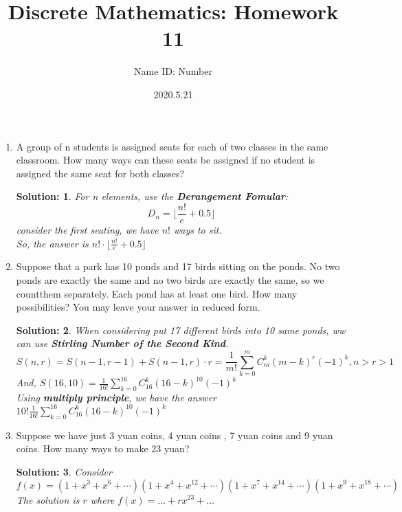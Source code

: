 \documentclass{article}
\title{Discrete Mathematics:  Homework 11}
\author{Name  \quad  \quad ID: Number}
\date{2020.5.21}
\theoremstyle{break}
\newtheorem*{solution*}{\textbf{Solution:} }
\begin{document}
\maketitle
\begin{enumerate}
        \item A group of n students is assigned seats for each of two classes in the same classroom. How many ways can these seats be assigned if no student is assigned the same seat for both classes?
        \begin{solution*}
                For n elements, use the \textbf{Derangement Fomular}:
                \[
                        D_n = \lfloor  \frac{n!}{e} + 0.5 \rfloor
                \]
                consider the first seating, we have $n!$ ways to sit.\\
                So, the answer is $n! \cdot \lfloor  \frac{n!}{e} + 0.5 \rfloor$
        \end{solution*}
        \vspace{10mm}
        \item Suppose that a park has 10 ponds and 17 birds sitting on the ponds.  No two ponds are exactly the same and no two birds are exactly the same, so we countthem separately.  Each pond has at least one bird.  How many possibilities?  You may leave your answer in reduced form.
        \begin{solution*}
                When considering put 17 different birds into 10 same ponds, ww can use \textbf{Stirling Number of the Second Kind}.\\
                $$S(n,r) = S(n-1,r-1) + S(n-1,r) \cdot r = \frac{1}{m!} \sum_{k=0}^{m} C_m^k(m-k)^r (-1)^k, n > r>1 $$
                And, $S(16,10)  = \frac{1}{16!} \sum_{k=0}^{16} C_{16}^k(16-k)^{10} (-1)^{k}$ \\
                Using \textbf{multiply principle}, we have the answer $10! \frac{1}{16!} \sum_{k=0}^{16} C_{16}^k(16-k)^{10} (-1)^{k}$
        \end{solution*}
        \vspace{10mm}
        \item Suppose we have just 3 yuan coins, 4 yuan coins , 7 yuan coins and 9 yuan coins.  How many ways to make 23 yuan?\\
        \begin{solution*}
                Consider $f(x) = (1 + x^3 + x^6 + \cdots)(1 + x^4 + x^12 + \cdots)(1 + x^7 + x^14 + \cdots)(1 + x^9 + x^18 + \cdots)$\\
                The solution is $r$ where $f(x) = \dots + rx^23 + \dots$\\

\end{solution*}
\end{enumerate}
\end{document}
